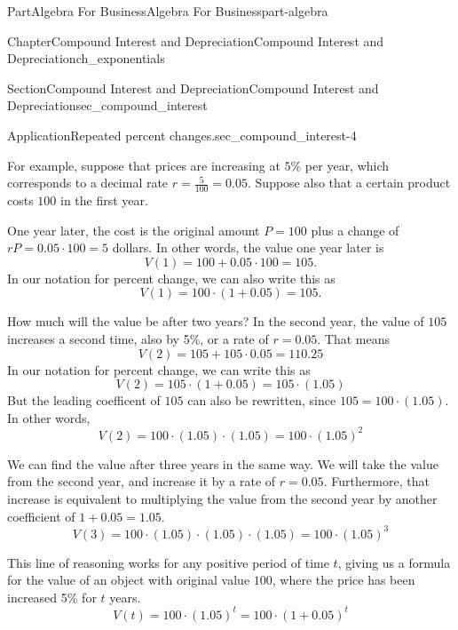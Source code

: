 \documentclass{tufte-book}
\numberwithin{equation}{chapter}
\begin{document}
\begin{partptx}{Part}{Algebra For Business}{}{Algebra For Business}{}{}{part-algebra}
\begin{chapterptx}{Chapter}{Compound Interest and Depreciation}{}{Compound Interest and Depreciation}{}{}{ch_exponentials}
\begin{sectionptx}{Section}{Compound Interest and Depreciation}{}{Compound Interest and Depreciation}{}{}{sec_compound_interest}
\begin{insight}{Application}{Repeated percent changes.}{sec_compound_interest-4}
\par
For example, suppose that prices are increasing at \(5\)\% per year, which corresponds to a decimal rate \(r = \frac{5}{100}=0.05\). Suppose also that a certain product costs \(100\)\textdollar{} in the first year.%
\par
One year later, the cost is the original amount \(P=100\) plus a change of \(rP = 0.05\cdot 100 = 5\) dollars.  In other words, the value one year later is%
\begin{equation*}
V(1) = 100 + 0.05\cdot 100 = 105.
\end{equation*}
In our notation for percent change, we can also write this as%
\begin{equation*}
V(1) = 100 \cdot (1+0.05) = 105.
\end{equation*}
%
\par
How much will the value be after two years? In the second year, the value of \(105\) increases a second time, also by 5\%, or a rate of \(r=0.05\).  That means%
\begin{equation*}
V(2) = 105 + 105\cdot 0.05 = 110.25
\end{equation*}
In our notation for percent change, we can write this as%
\begin{equation*}
V(2) = 105\cdot (1+0.05) = 105\cdot (1.05)
\end{equation*}
But the leading coefficent of \(105\) can also be rewritten, since \(105 = 100\cdot (1.05)\).  In other words,%
\begin{equation*}
V(2) = 100 \cdot (1.05) \cdot (1.05) = 100\cdot (1.05)^2
\end{equation*}
%
\par
We can find the value after three years in the same way. We will take the value from the second year, and increase it by a rate of \(r=0.05\). Furthermore, that increase is equivalent to multiplying the value from the second year by another coefficient of \(1+0.05=1.05\).%
\begin{equation*}
V(3) = 100 \cdot (1.05)\cdot (1.05)\cdot (1.05) = 100\cdot (1.05)^3
\end{equation*}
%
\par
This line of reasoning works for any positive period of time \(t\), giving us a formula for the value of an object with original value \(100\), where the price has been increased 5\% for \(t\) years.%
\begin{equation*}
V(t) = 100 \cdot (1.05)^t = 100\cdot (1 + 0.05)^t
\end{equation*}
%
\end{insight}

\end{sectionptx}
\end{chapterptx}
\end{partptx}
\end{document}
